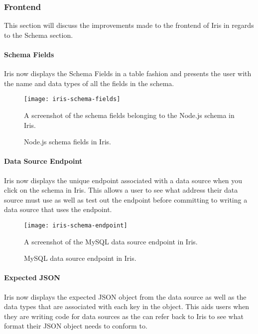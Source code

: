 \documentclass[12pt,a4paper,titlepage]{report}
\begin{document}
\subsubsection{Frontend}
This section will discuss the improvements made to the frontend of Iris in regards to the Schema section.

\paragraph{Schema Fields}
Iris now displays the Schema Fields in a table fashion and presents the user with the name and data types of all the fields in the schema.
\begin{figure}[H]
\begin{tcolorbox}
\begin{center}
\texttt{[image: iris-schema-fields]}
\end{center}
A screenshot of the schema fields belonging to the Node.js schema in Iris.
\end{tcolorbox}
\caption{Node.js schema fields in Iris.}
\end{figure}

\paragraph{Data Source Endpoint}
Iris now displays the unique endpoint associated with a data source when you click on the schema in Iris. This allows a user to see what address their data source must use as well as test out the endpoint before committing to writing a data source that uses the endpoint.

\begin{figure}[H]
\begin{tcolorbox}
\begin{center}
\texttt{[image: iris-schema-endpoint]}
\end{center}
A screenshot of the MySQL data source endpoint in Iris.
\end{tcolorbox}
\caption{MySQL data source endpoint in Iris.}
\end{figure}

\paragraph{Expected JSON}
Iris now displays the expected JSON object from the data source as well as the data types that are associated with each key in the object. This aids users when they are writing code for data sources as the can refer back to Iris to see what format their JSON object needs to conform to.
\end{document}
